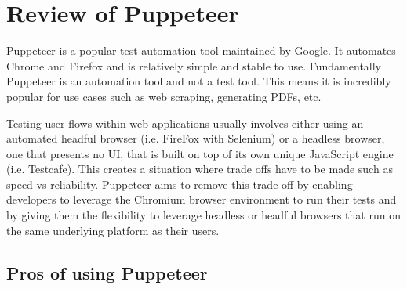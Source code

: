 \documentclass[12pt,a4paper,titlepage]{report}
\begin{document}
\section{Review of Puppeteer}

Puppeteer is a popular test automation tool maintained by Google. It automates Chrome and Firefox and is relatively simple and stable to use.
Fundamentally Puppeteer is an automation tool and not a test tool.
This means it is incredibly popular for use cases such as web scraping, generating PDFs, etc.

Testing user flows within web applications usually involves either using an automated headful
browser (i.e. FireFox with Selenium) or a headless browser, one that presents no UI, that is built on top of its own unique JavaScript
engine (i.e. Testcafe). This creates a situation where trade offs have to be made such as speed vs reliability.
Puppeteer aims to remove this trade off by enabling developers to leverage the Chromium browser environment
to run their tests and by giving them the flexibility to leverage headless or headful browsers that run on the same underlying platform as their users.

\subsection{Pros of using Puppeteer}
\end{document}
